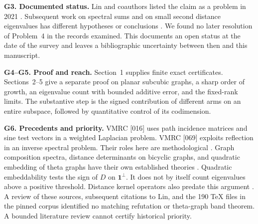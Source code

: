 \documentclass[11pt,a4paper]{article}
\newcommand{\one}{\mathbf1}\newcommand{\RR}{\mathbb R}\newcommand{\dd}{\,\mathrm d}
\newcommand{\hd}[1]{\textbf{#1.}}
\begin{document}
\par
\hd{G3. Documented status} Lin and coauthors listed the claim as a problem in 2021 \cite{survey}. Subsequent work on spectral sums and on small second distance eigenvalues has different hypotheses or conclusions \cite{sum,small}. We found no later resolution of Problem~4 in the records examined. This documents an open status at the date of the survey and leaves a bibliographic uncertainty between then and this manuscript.
\par
\hd{G4--G5. Proof and reach} Section~1 supplies finite exact certificates. Sections~2--5 give a separate proof on planar subcubic graphs, a sharp order of growth, an eigenvalue count with bounded additive error, and the fixed-rank limits. The substantive step is the signed contribution of different arms on an entire subspace, followed by quantitative control of its codimension.
\par
\hd{G6. Precedents and priority} VMRC [016] uses path incidence matrices and sine test vectors in a weighted Laplacian problem. VMRC [069] exploits reflection in an inverse spectral problem. Their roles here are methodological \cite{vmrc}. Graph composition spectra, distance determinants on bicyclic graphs, and quadratic embedding of theta graphs have their own established theories \cite{composition,det,qe}. Quadratic embeddability tests the sign of $D$ on $\one^\perp$. It does not by itself count eigenvalues above a positive threshold. Distance kernel operators also predate this argument \cite{kernel}. A review of these sources, subsequent citations to Lin, and the 190 TeX files in the pinned corpus identified no matching refutation or theta-graph band theorem. A bounded literature review cannot certify historical priority.
\vspace{-2mm}
\end{document}
